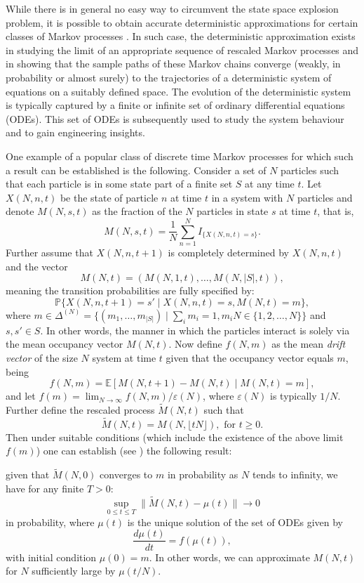 \documentclass[12pt]{report}
\newcommand{\E}{\mathbb{E}}
\begin{document}
While there is in general no easy way to circumvent the state space explosion problem, it is possible
to obtain accurate deterministic approximations for certain classes of Markov processes \cite{kurtz1, benaim1, ethier1}. In such case, the deterministic approximation exists
in studying the limit of an appropriate sequence of rescaled Markov processes and in showing that
the sample paths of these Markov chains converge (weakly, in probability or almost surely) to the
trajectories of a deterministic system of equations on a suitably defined space. The evolution of
the deterministic system is typically captured by a finite or infinite set of ordinary differential
equations (ODEs). This set of ODEs is subsequently used to study the system behaviour and to gain
engineering insights. 

One example of a popular class of discrete time Markov processes for which such a result can be
established is the following. Consider a set of $N$ particles such that each particle is in some state
part of a finite set $S$ at any time $t$. Let $X(N, n, t)$ be the state of particle $n$ at time $t$ in a system with $N$ particles and denote $M(N,s,t)$ as the fraction of the $N$ particles in state $s$ at time $t$, that is,
$$
M(N, s, t) = \frac{1}{N} \sum_{n=1}^N I_{\{X(N,n,t) = s\}}.
$$
Further assume that $X(N, n, t+1)$ is completely determined by $X(N,n,t)$ and the vector 
$$
M(N,t) = (M(N,1,t),\dots,M(N,|S|,t)),
$$
meaning the transition probabilities are fully specified by:
$$
\mathbb{P}\{X(N,n,t+1) = s' \mid X(N,n,t) = s, M(N,t) = m\},
$$
where $m \in \Delta^{(N)} = \{(m_1,\dots,m_{|S|}) \mid \sum_i m_i = 1, m_i N \in \{1,2,\dots,N\}\}$ and $s,s' \in S$. In other words, the manner in which the particles interact is solely via the mean occupancy vector $M(N,t)$. Now define $f(N,m)$ as the mean \textit{drift vector} of the size $N$ system at time $t$ given that the occupancy vector equals $m$, being
$$
f(N,m) = \E[M(N, t+1) - M(N,t) \mid M(N,t) = m],
$$
and let $f(m) = \lim_{N\rightarrow \infty} f(N,m) / \varepsilon(N)$, where $\varepsilon(N)$ is typically $1/N$. Further define the rescaled process $\tilde M(N,t)$ such that
$$
\tilde M(N,t) = M(N, \lfloor tN \rfloor ), \mbox{ for } t \geq 0.
$$
Then under suitable conditions (which include the existence of the above limit $f(m)$) one can establish (see \cite{benaim1}) the following result:

given that $\tilde M(N,0)$ converges to $m$ in probability as $N$ tends to infinity, we have for any finite $T > 0$:
$$
\sup_{0 \leq t \leq T} \| \tilde  M(N,t) - \mu(t) \| \rightarrow 0
$$
in probability, where $\mu(t)$ is the unique solution of the set of ODEs given by
$$
\frac{d \mu(t)}{dt} = f(\mu(t)),
$$
with initial condition $\mu(0) = m$. In other words, we can approximate $M(N,t)$ for $N$ sufficiently large by $\mu(t/N)$.
\end{document}
